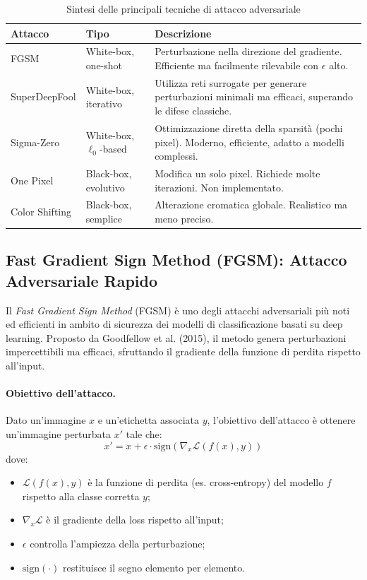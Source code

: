 \begin{table}[H]
\centering
\begin{tabularx}{\textwidth}{>{\raggedright\arraybackslash}p{3cm} >{\raggedright\arraybackslash}p{3.5cm} X}
\toprule
\textbf{Attacco} & \textbf{Tipo} & \textbf{Descrizione} \\
\midrule
FGSM & White-box, one-shot & Perturbazione nella direzione del gradiente. Efficiente ma facilmente rilevabile con $\epsilon$ alto. \\
SuperDeepFool & White-box, iterativo & Utilizza reti surrogate per generare perturbazioni minimali ma efficaci, superando le difese classiche. \\
Sigma-Zero & White-box, $\ell_0$-based & Ottimizzazione diretta della sparsità (pochi pixel). Moderno, efficiente, adatto a modelli complessi. \\
One Pixel & Black-box, evolutivo & Modifica un solo pixel. Richiede molte iterazioni. Non implementato. \\
Color Shifting & Black-box, semplice & Alterazione cromatica globale. Realistico ma meno preciso. \\
\bottomrule
\end{tabularx}
\caption{Sintesi delle principali tecniche di attacco adversariale}
\label{tab:attacchi_adversariali_min}
\end{table}



\subsection{Fast Gradient Sign Method (FGSM): Attacco Adversariale Rapido}
\label{sec:fgsm}

Il \textit{Fast Gradient Sign Method} (FGSM) è uno degli attacchi adversariali più noti ed efficienti in ambito di sicurezza dei modelli di classificazione basati su deep learning. Proposto da Goodfellow et al. (2015), il metodo genera perturbazioni impercettibili ma efficaci, sfruttando il gradiente della funzione di perdita rispetto all’input.

\paragraph{Obiettivo dell’attacco.}
Dato un’immagine $x$ e un’etichetta associata $y$, l’obiettivo dell’attacco è ottenere un’immagine perturbata $x'$ tale che:
\[
x' = x + \epsilon \cdot \text{sign} \left( \nabla_x \mathcal{L}(f(x), y) \right)
\]
dove:
\begin{itemize}
    \item $\mathcal{L}(f(x), y)$ è la funzione di perdita (es. cross-entropy) del modello $f$ rispetto alla classe corretta $y$;
    \item $\nabla_x \mathcal{L}$ è il gradiente della loss rispetto all’input;
    \item $\epsilon$ controlla l’ampiezza della perturbazione;
    \item $\text{sign}(\cdot)$ restituisce il segno elemento per elemento.
\end{itemize}

